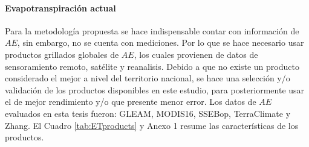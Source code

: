 \documentclass[12pt]{article}
\begin{document}


\clearpage

\paragraph{Evapotranspiración actual}\mbox{}

Para la metodología propuesta se hace indispensable contar con información de $AE$, sin embargo, no se cuenta con mediciones. Por lo que se hace necesario usar productos grillados globales de $AE$, los cuales provienen de datos de sensoramiento remoto, satélite y reanalisis. Debido a que no existe un producto considerado el mejor a nivel del territorio nacional, se hace una selección y/o validación de los productos disponibles en este estudio, para posteriormente usar el de mejor rendimiento y/o que presente menor error. Los datos de $AE$ evaluados en esta tesis fueron: GLEAM, MODIS16, SSEBop, TerraClimate y Zhang. El Cuadro \ref{tab:ETproducts} y Anexo 1 resume las características de los productos.
\end{document}
